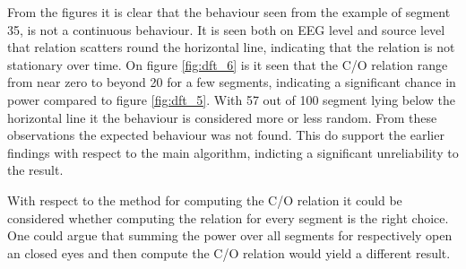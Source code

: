 \noindent
From the figures it is clear that the behaviour seen from the example of segment 35, is not a continuous behaviour. It is seen both on EEG level and source level that relation scatters round the horizontal line, indicating that the relation is not stationary over time. 
On figure \ref{fig:dft_6} is it seen that the C/O relation range from near zero to beyond 20 for a few segments, indicating a significant chance in power compared to figure \ref{fig:dft_5}. With 57 out of 100 segment lying below the horizontal line it the behaviour is considered more or less random. 
From these observations the expected behaviour was not found. This do support the earlier findings with respect to the main algorithm, indicting a significant unreliability to the result.

With respect to the method for computing the C/O relation it could be considered whether computing the relation for every segment is the right choice. One could argue that summing the power over all segments for respectively open an closed eyes and then compute the C/O relation would yield a different result.  
   
